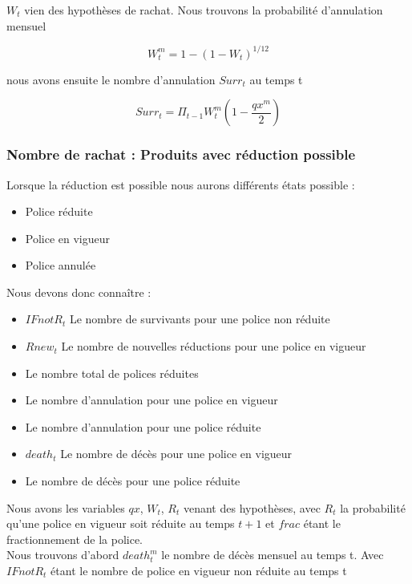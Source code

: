 \documentclass{article}
\begin{document}
\hfill \break $W_{t}$ vien des hypothèses de rachat. Nous trouvons la probabilité d'annulation mensuel

\begin{equation}
 W^m_{t} = 1-(1-W_{t})^{1/12} 
\end{equation}



\noindent nous avons ensuite le nombre d'annulation $Surr_t$ au temps t

\begin{equation}
  Surr_t = {\Pi}_{t-1} W^m_{t}(1- \frac{qx^m}{2})
\end{equation}


\subsubsection{Nombre de rachat : Produits avec réduction possible}

Lorsque la réduction est possible nous aurons différents états possible :
\begin{itemize}
\item Police réduite
\item Police en vigueur
\item Police annulée\\
\end{itemize}
Nous devons donc connaître :

\begin{itemize}
\item $IFnotR_t$ Le nombre de survivants pour une police non réduite
\item $Rnew_t$ Le nombre de nouvelles réductions pour une police en vigueur 
\item Le nombre total de polices réduites
\item Le nombre d'annulation pour une police en vigueur
\item Le nombre d'annulation pour une police réduite
\item $death_t$ Le nombre de décès pour une police en vigueur
\item Le nombre de décès pour une police réduite\\
\end{itemize}

Nous avons les variables $qx$, $W_t$, $R_t$ venant des hypothèses, avec $R_t$ la probabilité qu'une police en vigueur soit réduite au temps $t+1$ et $frac$ étant le fractionnement de la police.\\

Nous trouvons d'abord $death_t^m$ le nombre de décès mensuel au temps t. Avec $IFnotR_t$ étant le nombre de police en vigueur non réduite au temps t
\end{document}
